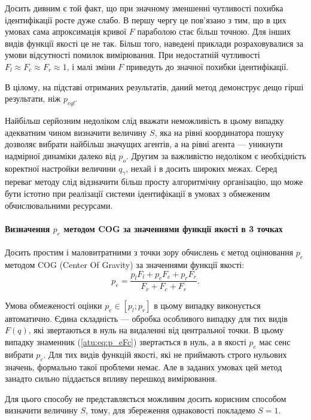 Досить дивним є той факт, що при значному зменшенні чутливості похибка
ідентифікації росте дуже слабо. В першу чергу це пов'язано з тим, що в цих
умовах сама апроксимація кривої $F$ параболою стає більш точною. Для інших
видів функції якості це не так. Більш того, наведені приклади розраховувалися
за умови відсутності помилок вимірювання. При недостатній чутливості
$F_l \approx F_c \approx F_r \approx 1$, і малі зміни $F$ приведуть до значної
похибки ідентифікації.

В цілому, на підставі отриманих результатів, даний метод демонструє дещо
гірші результати, ніж $p_{eql}$.

Найбільш серйозним недоліком слід вважати неможливість в цьому
випадку адекватним чином визначити величину
$S$, яка на рівні координатора пошуку дозволяє вибрати найбільш
значущих агентів, а на рівні агента --- уникнути надмірної
динаміки далеко від
$p_o$. Другим за важливістю недоліком є необхідність коректної
настройки величини
$q_\gamma$, нехай і в досить широких межах. Серед переваг методу
слід відзначити більш просту алгоритмічну організацію, що може
бути істотно при реалізації системи ідентифікації в умовах з
обмеженим обчислювальними ресурсами.



\paragraph{Визначення $p_e$ методом COG за значеннями функції якості в 3 точках}

Досить простим і маловитратними з точки зору обчислень є метод оцінювання $p_e$ методом
COG (Center Of Gravity) за значеннями функції якості:
%
\begin{equation}
  p_e =
  \frac{p_l F_l + p_c F_c + p_r F_r}{ F_r + F_c + F_r}  .
  \label{atu:eq:p_eFc}
\end{equation}

Умова обмеженості оцінки $p_e \in [p_l; p_r]$ в цьому випадку виконується
автоматично.
Єдина складність --- обробка особливого випадку для тих видів
$F(q)$, які звертаються в нуль на видаленні від центральної
точки. В цьому випадку знаменник (\ref{atu:eq:p_eFc}) звертається в нуль,
а в якості $p_e$ має сенс вибрати $p_c$.
Для тих видів функцій якості, які не приймають строго
нульових значень, формально такої проблеми немає.
Але в заданих умовах цей метод занадто
сильно піддається впливу перешкод вимірювання.

Для цього способу не представляється можливим досить корисним
способом визначити величину
$S$, тому, для збереження однаковості покладемо
$S = 1$.

